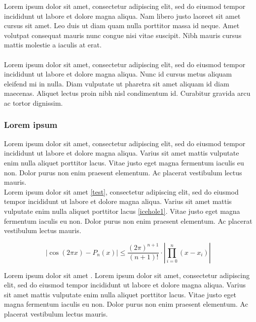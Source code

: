 
Lorem ipsum dolor sit amet, consectetur adipiscing elit, sed do eiusmod tempor incididunt ut labore et dolore magna aliqua. Nam libero justo laoreet sit amet cursus sit amet. Leo duis ut diam quam nulla porttitor massa id neque. Amet volutpat consequat mauris nunc congue nisi vitae suscipit. Nibh mauris cursus mattis molestie a iaculis at erat. \\
\\
\noindent Lorem ipsum dolor sit amet, consectetur adipiscing elit, sed do eiusmod tempor incididunt ut labore et dolore magna aliqua. Nunc id cursus metus aliquam eleifend mi in nulla. Diam vulputate ut pharetra sit amet aliquam id diam maecenas. Aliquet lectus proin nibh nisl condimentum id. Curabitur gravida arcu ac tortor dignissim.

\clearpage




\subsubsection{Lorem ipsum}

\noindent Lorem ipsum dolor sit amet, consectetur adipiscing elit, sed do eiusmod tempor incididunt ut labore et dolore magna aliqua. Varius sit amet mattis vulputate enim nulla aliquet porttitor lacus. Vitae justo eget magna fermentum iaculis eu non. Dolor purus non enim praesent elementum. Ac placerat vestibulum lectus mauris. \\

\noindent Lorem ipsum dolor sit amet \autoref{test}, consectetur adipiscing elit, sed do eiusmod tempor incididunt ut labore et dolore magna aliqua. Varius sit amet mattis vulputate enim nulla aliquet porttitor lacus \autoref{icehole1}. Vitae justo eget magna fermentum iaculis eu non. Dolor purus non enim praesent elementum. Ac placerat vestibulum lectus mauris.

\begin{equation}
\label{test}
|\cos{(2\pi x)}-P_n(x)|\leq \frac{(2\pi)^{n+1}}{(n+1)!}\cdot|\prod_{i=0}^n(x-x_i)|
\end{equation}


\noindent Lorem ipsum dolor sit amet \cite{Driscoll_Fornberg}. Lorem ipsum dolor sit amet, consectetur adipiscing elit, sed do eiusmod tempor incididunt ut labore et dolore magna aliqua. Varius sit amet mattis vulputate enim nulla aliquet porttitor lacus. Vitae justo eget magna fermentum iaculis eu non. Dolor purus non enim praesent elementum. Ac placerat vestibulum lectus mauris.

